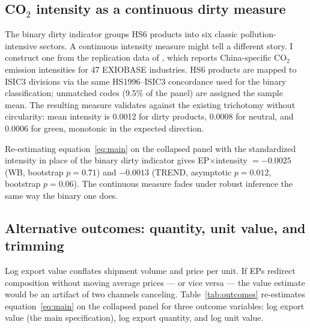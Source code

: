\documentclass[12pt]{article}
\begin{document}
\subsection{CO$_2$ intensity as a continuous dirty measure}

The binary dirty indicator groups HS6 products into six classic pollution-intensive
sectors. A continuous intensity measure might tell a different story. I construct one
from the replication data of \citet{shapiro2021}, which reports China-specific CO$_2$
emission intensities for 47 EXIOBASE industries. HS6 products are mapped to ISIC3
divisions via the same HS1996--ISIC3 concordance used for the binary classification;
unmatched codes (9.5\% of the panel) are assigned the sample mean. The resulting measure
validates against the existing trichotomy without circularity: mean intensity is 0.0012
for dirty products, 0.0008 for neutral, and 0.0006 for green, monotonic in the expected
direction.

Re-estimating equation~\eqref{eq:main} on the collapsed panel with the standardized
intensity in place of the binary dirty indicator gives EP$\times$intensity $= -0.0025$
(WB, bootstrap $p = 0.71$) and $-0.0013$ (TREND, asymptotic $p = 0.012$, bootstrap
$p = 0.06$). The continuous measure fades under robust inference the same way the binary
one does.

\subsection{Alternative outcomes: quantity, unit value, and trimming}

Log export value conflates shipment volume and price per unit. If EPs redirect
composition without moving average prices --- or vice versa --- the value estimate would
be an artifact of two channels canceling. Table~\ref{tab:outcomes} re-estimates
equation~\eqref{eq:main} on the collapsed panel for three outcome variables: log export
value (the main specification), log export quantity, and log unit value.
\end{document}
